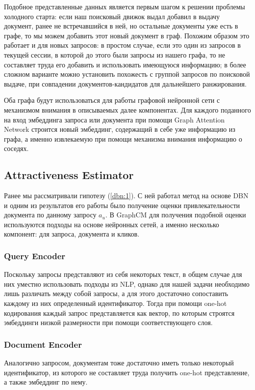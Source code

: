 \documentclass[diploma]{nanolab2015}
\begin{document}
Подобное представленные данных является первым шагом к решении проблемы холодного старта: если наш поисковый движок выдал добавил в выдачу документ, ранее не встречавшийся в ней, но остальные документы уже есть в графе, то мы можем добавить этот новый документ в граф. Похожим образом это работает и для новых запросов: в простом случае, если это один из запросов в текущей сессии, в которой до этого были запросы из нашего графа, то не составляет труда его добавить и использовать имеющуюся информацию; в более сложном варианте можно установить похожесть с группой запросов по поисковой выдаче, при совпадении документов-кандидатов для дальнейшего ранжирования.

Оба графа будут использоваться для работы графовой нейронной сети с механизмом внимания \cite{GAT} в описываемых далее компонентах. Для каждого поданного на вход эмбеддинга запроса или документа при помощи Graph Attention Network строится новый эмбеддинг, содержащий в себе уже информацию из графа, а именно извлекаемую при помощи механизма внимания \cite{Attention} информацию о соседях.

\subsection{Attractiveness Estimator}
Ранее мы рассматривали гипотезу (\ref{dbn:1}). С ней работал метод на основе DBN и одним из результатов его работы было получение оценки привлекательности документа по данному запросу $a_u$. В GraphCM для получения подобной оценки используются подходы на основе нейронных сетей, а именно несколько компонент: для запроса, документа и кликов.

\subsubsection{Query Encoder}
Поскольку запросы представляют из себя некоторых текст, в общем случае для них уместно использовать подходы из NLP, однако для нашей задачи необходимо лишь различать между собой запросы, а для этого достаточно сопоставить каждому из них определенный идентификатор. Тогда при помощи one-hot кодирования каждый запрос представляется как вектор, по которым строятся эмбеддинги низкой размерности при помощи соответствующего слоя.


\subsubsection{Document Encoder}
Аналогично запросом, документам тоже достаточно иметь только некоторый идентификатор, из которого не составляет труда получить one-hot представление, а также эмбеддинг по нему.
\end{document}
